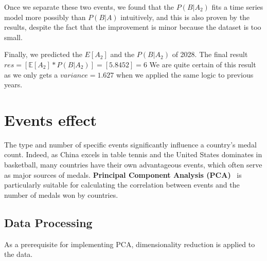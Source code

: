 \documentclass{mcmthesis}
\begin{document}
Once we separate these two events, we found that the $P(B|A_2)$ fits a time series model more possibly than $P(B|A)$ intuitively, and this is also proven by the results, despite the fact that the improvement is minor because the dataset is too small.

Finally, we predicted the $E[A_2]$ and the $P(B|A_2)$ of 2028. The final result $res = [\mathbb{E}[A_2] * P(B|A_2)] = [5.8452] = 6$ We are quite certain of this result as we only gets a $variance = 1.627$ when we applied the same logic to previous years.


\section{Events effect}

The type and number of specific events significantly influence a country's medal count. Indeed, as China excels in table tennis and the United States dominates in basketball, many countries have their own advantageous events, which often serve as major sources of medals. \textbf{Principal Component Analysis (PCA)}~\cite{8} is particularly suitable for calculating the correlation between events and the number of medals won by countries.

\subsection{Data Processing}

As a prerequisite for implementing PCA, dimensionality reduction is applied to the data.
\end{document}
